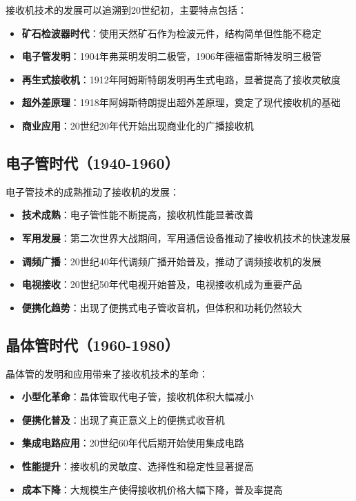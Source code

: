 \documentclass[12pt,UTF8]{ctexbook}
\begin{document}
接收机技术的发展可以追溯到20世纪初，主要特点包括：

\begin{itemize}[leftmargin=3.5em]
    \item \textbf{矿石检波器时代}：使用天然矿石作为检波元件，结构简单但性能不稳定
    \item \textbf{电子管发明}：1904年弗莱明发明二极管，1906年德福雷斯特发明三极管
    \item \textbf{再生式接收机}：1912年阿姆斯特朗发明再生式电路，显著提高了接收灵敏度
    \item \textbf{超外差原理}：1918年阿姆斯特朗提出超外差原理，奠定了现代接收机的基础
    \item \textbf{商业应用}：20世纪20年代开始出现商业化的广播接收机
\end{itemize}

\subsection{电子管时代（1940-1960）}

电子管技术的成熟推动了接收机的发展：

\begin{itemize}[leftmargin=3.5em]
    \item \textbf{技术成熟}：电子管性能不断提高，接收机性能显著改善
    \item \textbf{军用发展}：第二次世界大战期间，军用通信设备推动了接收机技术的快速发展
    \item \textbf{调频广播}：20世纪40年代调频广播开始普及，推动了调频接收机的发展
    \item \textbf{电视接收}：20世纪50年代电视开始普及，电视接收机成为重要产品
    \item \textbf{便携化趋势}：出现了便携式电子管收音机，但体积和功耗仍然较大
\end{itemize}

\subsection{晶体管时代（1960-1980）}

晶体管的发明和应用带来了接收机技术的革命：

\begin{itemize}[leftmargin=3.5em]
    \item \textbf{小型化革命}：晶体管取代电子管，接收机体积大幅减小
    \item \textbf{便携化普及}：出现了真正意义上的便携式收音机
    \item \textbf{集成电路应用}：20世纪60年代后期开始使用集成电路
    \item \textbf{性能提升}：接收机的灵敏度、选择性和稳定性显著提高
    \item \textbf{成本下降}：大规模生产使得接收机价格大幅下降，普及率提高
\end{itemize}
\end{document}
